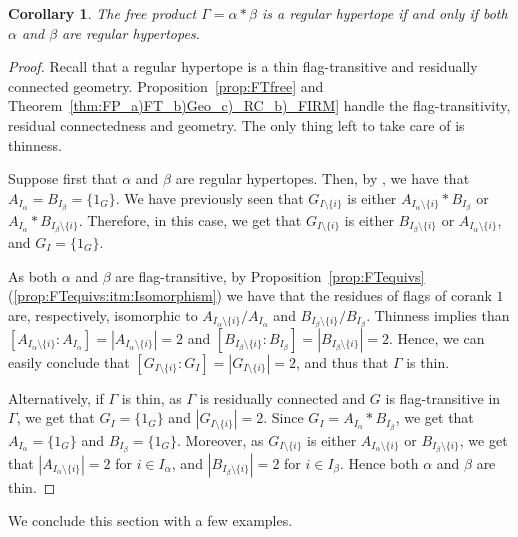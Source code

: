 \documentclass[11pt,letterpaper]{amsart}
\newtheorem{coro}[prop]{Corollary}
\begin{document}
\begin{coro}\label{coro:FreeProductHypertopes}
    The free product $\Gamma  = \alpha * \beta$ is a regular hypertope if and only if both $\alpha$ and $\beta$ are regular hypertopes.
\end{coro}
\begin{proof}
    Recall that a regular hypertope is a thin flag-transitive and residually connected geometry. Proposition~\ref{prop:FTfree} and Theorem~\ref{thm:FP_a)FT_b)Geo_c)_RC_b)_FIRM} handle the flag-transitivity, residual connectedness and geometry. The only thing left to take care of is thinness.

    Suppose first that $\alpha$ and $\beta$ are regular hypertopes. Then, by \cite[Lemma~3.4]{hypertopes}, we have that $A_{I_\alpha}= B_{I_\beta}=\{1_G\}$.
    We have previously seen that $G_{I\setminus\{i\}}$ is either $A_{I_\alpha\setminus\{i\}}*B_{I_\beta}$ or $A_{I_\alpha} * B_{I_\beta\setminus\{i\}}$. Therefore, in this case, we get that $G_{I\setminus\{i\}}$ is either $B_{I_\beta\setminus\{i\}}$ or $A_{I_\alpha\setminus\{i\}}$, and $G_I = \{1_G\}$. 
    
    As both $\alpha$ and $\beta$ are flag-transitive, by Proposition~\ref{prop:FTequivs}(\ref{prop:FTequivs:itm:Isomorphism}) we have that the residues of flags of corank $1$ are, respectively, isomorphic to $A_{I_\alpha\setminus\{i\}}/A_{I_\alpha}$ and $B_{I_\beta\setminus\{i\}}/B_{I_\beta}$. Thinness implies than $[A_{I_\alpha\setminus\{i\}}:A_{I_\alpha}]= |A_{I_\alpha\setminus\{i\}}|= 2$ and $[B_{I_\beta\setminus\{i\}} :B_{I_\beta}] =|B_{I_\beta\setminus\{i\}}| = 2$.
    Hence, we can easily conclude that $[G_{I\setminus\{i\}} : G_I ] = |G_{I\setminus\{i\}}| = 2$, and thus that $\Gamma$ is thin.

    Alternatively, if $\Gamma$ is thin, as $\Gamma$ is residually connected and $G$ is flag-transitive in $\Gamma$, we get that $G_I=\{1_G\}$ and $|G_{I\setminus\{i\}}|=2$. Since $G_I = A_{I_\alpha}*B_{I_\beta}$, we get that $A_{I_\alpha}=\{1_G\}$ and $B_{I_\beta}=\{1_G\}$. Moreover, as $G_{I\setminus\{i\}}$ is either $A_{I_\alpha\setminus\{i\}}$ or $B_{I_\beta\setminus\{i\}}$, we get that $|A_{I_\alpha\setminus\{i\}}| = 2$ for $i\in I_\alpha$, and $|B_{I_\beta\setminus\{i\}}| = 2$ for $i\in I_\beta$. Hence both $\alpha$ and $\beta$ are thin.
\end{proof}

We conclude this section with a few examples.
\end{document}
